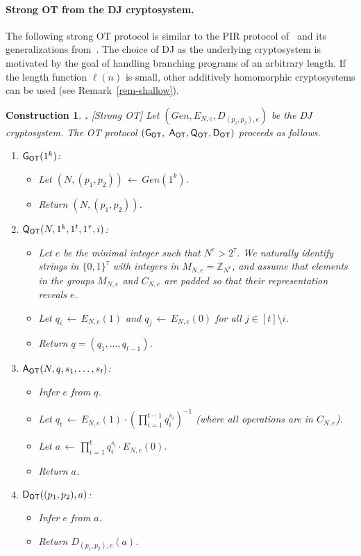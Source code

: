 \documentclass{article}
\newcommand{\genot}{{\sf G_{OT}}}
\newcommand{\queot}{{\sf Q_{OT}}}
\newcommand{\ansot}{{\sf A_{OT}}}
\newcommand{\decot}{{\sf D_{OT}}}
\newcommand{\otl}{{\tau}}
\newcommand{\gendj}{Gen}
\newcommand{\encdj}{{E}_{N,e}}
\newcommand{\decdj}{{D}_{(p_1,p_2),e}}
\newcommand{\size}[1]{|#1|}
\newcommand{\Z}{{\mathbb{Z}}}
\newtheorem{CONSTRUCTION}{Construction}[section]
\newenvironment{construction}{\begin{CONSTRUCTION} \hspace{-.85em} {\bf .} \rm}%
	{\end{CONSTRUCTION}}
\newcommand{\from}{{\,\leftarrow\,}}
\newcommand{\opbrange}[3][,]{#2#1\ldots#1#3}
\begin{document}
\paragraph{\bf Strong OT from the DJ cryptosystem.}
The following strong OT protocol is similar to the PIR protocol
of~\cite{KO97} and its generalizations
from~\cite{Ste98,L04}.
The choice of DJ as the underlying cryptosystem is
motivated by the goal of handling branching programs of an
arbitrary length. If the length function $\ell(n)$ is small, other additively
homomorphic cryptosystems can be used (see
Remark~\ref{rem-shallow}).
\begin{construction}[Strong OT]
\rm \label{con-otimpl-smh} Let $(\gendj,\encdj,\decdj)$ be the DJ
cryptosystem. The OT protocol $(\genot,$ $\ansot,\queot,\decot)$
proceeds as follows.
\begin{enumerate}
\item $\genot(1^k)$:
\begin{itemize}
\item Let $(N,(p_1,p_2))\from\gendj(1^k)$.
\item Return $(N,(p_1,p_2))$.
\end{itemize}
\item $\queot(N,1^k,1^t,1^{\otl},i)$:
\begin{itemize}
\item Let $e$ be the minimal integer such that $N^e > 2^\otl$. We
naturally identify strings in $\{0,1\}^\otl$ with integers in
$M_{N,e}=\Z_{N^e}$, and assume that elements in the groups
$M_{N,e}$ and $C_{N,e}$ are padded so that their representation
reveals $e$.
\item Let $q_i\from\encdj(1)$ and $q_j\from\encdj(0)$ for all
$j\in[t]\setminus i$.
\item Return $q=(q_1,\ldots,q_{t-1})$.
\end{itemize}
\item $\ansot(N,q,\opbrange{s_1}{s_t})$:
\begin{itemize}
\item Infer $e$ from $q$.
\item Let $q_t\from\encdj(1)\cdot
(\prod_{i=1}^{t-1}{q_i^{s_i}})^{-1}$ (where all operations are in
$C_{N,e}$).
\item Let $a\from\prod_{i=1}^t q_i^{s_i}\cdot\encdj(0)$.
\item Return $a$.
\end{itemize}
\item $\decot((p_1,p_2),a)$:
\begin{itemize}
\item Infer $e$ from $a$.
\item Return $\decdj(a)$.
\end{itemize}
\end{enumerate}
\end{construction}
\end{document}
